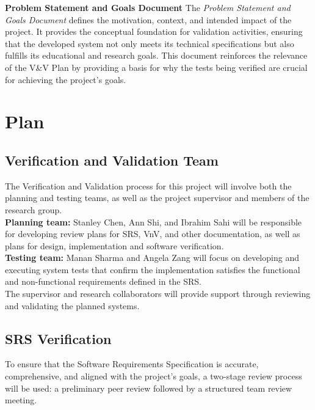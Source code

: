 \documentclass[12pt, titlepage]{article}
\begin{document}
\textbf{Problem Statement and Goals Document}
\newline
\newline
The \textit{Problem Statement and Goals Document} defines the motivation, context, and intended impact of the project. It provides the conceptual foundation for validation activities, ensuring that the developed system not only meets its technical specifications but also fulfills its educational and research goals. This document reinforces the relevance of the V\&V Plan by providing a basis for why the tests being verified are crucial for achieving the project’s goals.
\newline

\section{Plan}


\subsection{Verification and Validation Team}

The Verification and Validation process for this project will involve both the planning and testing teams, as well as the project supervisor and members of the research group.\\

\textbf{Planning team:} Stanley Chen, Ann Shi, and Ibrahim Sahi will be responsible for developing review plans for SRS, VnV, and other documentation, as well as plans for design, implementation and software verification.\\

\textbf{Testing team:} Manan Sharma and Angela Zang will focus on developing and executing system tests that confirm the implementation satisfies the functional and non-functional requirements defined in the SRS.\\

The supervisor and research collaborators will provide support through reviewing and validating the planned systems.

\subsection{SRS Verification}

To ensure that the Software Requirements Specification is accurate, comprehensive, and aligned with the project’s goals, a two-stage review process will be used: a preliminary peer review followed by a structured team review meeting.\\
\end{document}
